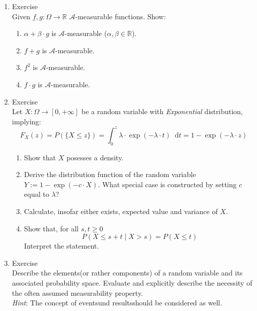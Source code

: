\documentclass[12pt,a4paper]{article}
\newcommand*\diff{\mathop{}\!\mathrm{d}}
\begin{document}
\begin{enumerate}
\begin{enumerate}[label=(\roman*)]
\end{enumerate}

\item Exercise \\
Given $f, g: \Omega\to \mathbb{R}$ $\mathscr{A}$-measurable functions.  Show:
\begin{enumerate}[label=(\roman*)]

\item $\alpha + \beta \cdot g$ is $\mathscr{A}$-measurable ($\alpha, \beta \in \mathbb{R}$).

\item $f + g$ is $\mathscr{A}$-measurable.

\item $f ^2$ is $\mathscr{A}$-measurable.

\item $f \cdot g$ is $\mathscr{A}$-measurable.

\end{enumerate}
\newpage
\item Exercise \\
Let $X: \Omega \to \left[ 0, + \infty \right]$ be a random variable with \textit{Exponential} distribution, implying:
\[
F_{X} (z) = P(\{ X \leq z\} ) = \int_0^z \lambda \cdot \exp(- \lambda \cdot t) \diff t = 1 - \exp (- \lambda \cdot z)
\]
\begin{enumerate}[label=(\roman*)]

\item Show that $X$ posesses a density.

\item Derive the distribution function of the random variable $Y:= 1 - \exp (-c \cdot X)$. What special case is constructed by setting $c$ equal to $\lambda$?

\item Calculate, insofar either exists, expected value and variance of $X$.

\item Show that, for all $s, t \geq 0$
\[
P(X \leq s + t \mid X > s) = P(X \leq t)
\]
Interpret the statement.

\end{enumerate}


\item Exercise \\
Describe the \glqq elements\grqq(or rather components) of a random variable and its associated probability space. Evaluate and explicitly describe the necessity of the often assumed measurability property.\\ \textit{Hint}: The concept of \glqq events\grqq und \glqq results\grqq should be considered as well.


\end{enumerate}
\end{document}
